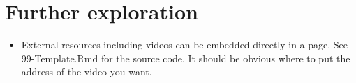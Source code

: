 \documentclass[
  12pt, openany]{book}
\providecommand{\tightlist}{%
  \setlength{\itemsep}{0pt}\setlength{\parskip}{0pt}}
\begin{document}
\hypertarget{further-exploration}{%
\section*{Further exploration}\label{further-exploration}}


\begin{itemize}
\tightlist
\item
  External resources including videos can be embedded directly in a page. See 99-Template.Rmd for the source code. It should be obvious where to put the address of the video you want.
\end{itemize}
\end{document}
